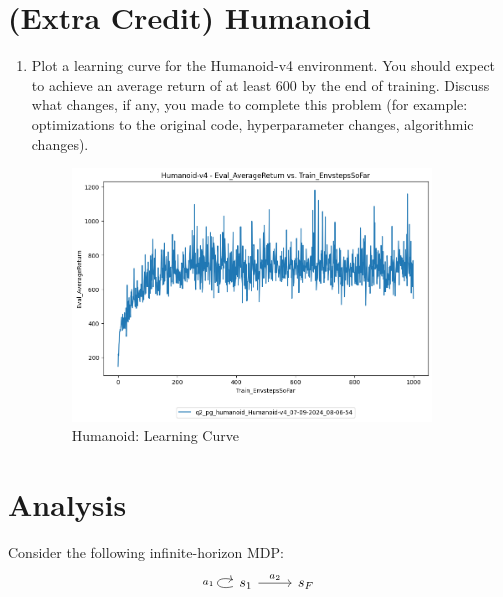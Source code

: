 \documentclass{article}
\begin{document}
\newpage\section{(Extra Credit) Humanoid}
\begin{enumerate}
    \item Plot a learning curve for the Humanoid-v4 environment. You should expect to achieve an average return of at least 600 by the end of training. Discuss what changes, if any, you made to complete this problem (for example: optimizations to the original code, hyperparameter changes, algorithmic changes).
     \begin{figure}[ht]
    	\centering
    	\includegraphics[width=0.9\textwidth]{./images/8-Humanoid-LearningCurve.png}
    	\caption{Humanoid: Learning Curve}
    	\label{fig:8-Humanoid-LearningCurve}
    \end{figure}
\end{enumerate}

\newpage\section{Analysis}
\label{sec:analysis}
Consider the following infinite-horizon MDP:
\[\begin{tikzcd}
	s_1 & {s_F}
	\arrow["{a_2}", from=1-1, to=1-2]
    \arrow["{a_1}", loop left, from=1-1, to=1-1]
\end{tikzcd}\]
\newcommand{\Rmax}[0]{R_{\textrm{max}}}
\newcommand{\E}[0]{\mathbb{E}}
\newcommand{\var}[0]{\textrm{Var}}
\newcommand\question[1][]{\item\refstepcounter{subsection}\label[question]{#1}}
\end{document}
